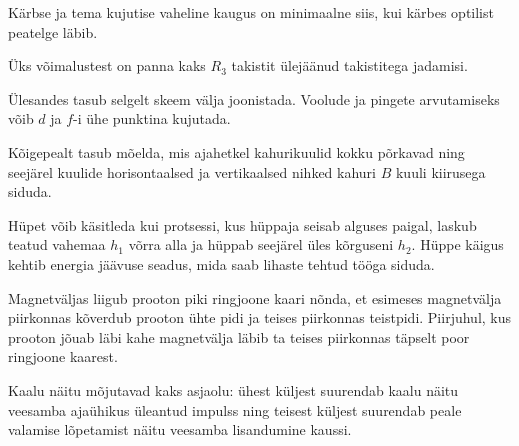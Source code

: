 \documentclass[10pt]{article}
\begin{document}

\hint
Kärbse ja tema kujutise vaheline kaugus on minimaalne siis, kui kärbes optilist peatelge läbib.
\probend
\bigskip


\hint
Üks võimalustest on panna kaks $R_3$ takistit ülejäänud takistitega jadamisi.
\probend
\bigskip


\hint
Ülesandes tasub selgelt skeem välja joonistada. Voolude ja pingete arvutamiseks võib $d$ ja $f$-i ühe punktina kujutada.
\probend
\bigskip


\hint
Kõigepealt tasub mõelda, mis ajahetkel kahurikuulid kokku põrkavad ning seejärel kuulide horisontaalsed ja vertikaalsed nihked kahuri $B$ kuuli kiirusega siduda.
\probend
\bigskip


\hint
Hüpet võib käsitleda kui protsessi, kus hüppaja seisab alguses paigal, laskub teatud vahemaa $h_1$ võrra alla ja hüppab seejärel üles kõrguseni $h_2$. Hüppe käigus kehtib energia jäävuse seadus, mida saab lihaste tehtud tööga siduda.
\probend
\bigskip


\hint
Magnetväljas liigub prooton piki ringjoone kaari nõnda, et esimeses magnetvälja piirkonnas kõverdub prooton ühte pidi ja teises piirkonnas teistpidi. Piirjuhul, kus prooton jõuab läbi kahe magnetvälja läbib ta teises piirkonnas täpselt poor ringjoone kaarest.
\probend
\bigskip


\hint
Kaalu näitu mõjutavad kaks asjaolu: ühest küljest suurendab kaalu näitu veesamba ajaühikus üleantud impulss ning teisest küljest suurendab peale valamise lõpetamist näitu veesamba lisandumine kaussi.
\probend
\bigskip
\end{document}
